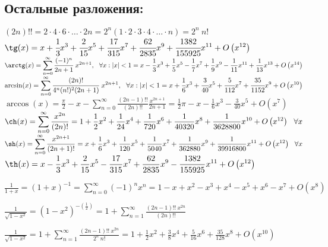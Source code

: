 \documentclass[12pt, a6paper]{extarticle}
\begin{document}
\subsection{Остальные разложения:}
$ (2n)!! = 2 \cdot 4 \cdot 6 \cdot \ldots \cdot 2n = 2^n (1 \cdot 2 \cdot 3 \cdot 4 \cdot \ldots \cdot n)=2^n\ n! $
\newline \newline \newline
$\displaystyle \tg(x) = x+\cfrac{1}{3}x^{3}+\cfrac{2}{15} {x}^{5}+{\cfrac {17}{315}} {x}^{7}+{\cfrac {62}{2835}} {x}^{9}
\mbox{}+{\cfrac {1382}{155925}} {x}^{11}+O \left( {x}^{12} \right) $
\newline \newline
$\displaystyle  \arctg(x) = \sum\limits_{n=0}^\infty{\cfrac{(-1)^n}{2n+1}\ x^{2n+1}}, \ \ \forall x: |x|<1 = x-\frac{1}{3} {x}^{3}+\frac{1}{5} {x}^{5}-\frac{1}{7} {x}^{7}+\frac{1}{9} {x}^{9}-\frac{1}{11} {x}^{11}+\frac{1}{13} {x}^{13}+O \left( {x}^{14} \right)$
\newline \newline
$\displaystyle \arcsin(x) = \sum\limits_{n=0}^\infty{\cfrac{(2n)!}{4^n(n!)^2(2n+1)}\ x^{2n+1}}, \ \ \forall x: |x|<1 = x+\cfrac{1}{6} {x}^{3}+{\cfrac {3}{40}} {x}^{5}+{\cfrac {5}{112}} {x}^{7} + {\cfrac {35}{1152}} {x}^{9}+O \left( {x}^{10} \right)$
\newline \newline
$\displaystyle \arccos(x) = \frac{\pi}{2} - x - \sum\limits_{n=0}^\infty{\frac{(2n-1)!!}{(2n)!!}\frac{x^{2n+1}}{2n+1}} = \frac{1}{2} \pi -x-\frac{1}{6} {x}^{3}-{\frac {3}{40}} {x}^{5} + O \left( {x}^{7} \right)$
\newline \newline
$\displaystyle \ch(x) = \sum\limits_{n=0}^\infty{\frac{x^{2n}}{(2n)!}} = 1+\frac{1}{2}x^2+\frac{1}{24}x^4+\frac{1}{720}x^6+\frac{1}{40320}x^8+\frac{1}{3628800}x^{10} + O\left( {x}^{12} \right)\ \ \forall x$
\newline \newline
$\displaystyle \sh(x) = \sum\limits_{n=0}^\infty{\frac{x^{2n+1}}{(2n+1)!}} =  x+\frac{1}{6}x^3+\frac{1}{120}x^5+\frac{1}{5040}x^7+\frac{1}{362880}x^9+\frac{1}{39916800}x^{11} + O\left( {x}^{12} \right)\ \ \forall x$
\newline \newline
$\displaystyle \th(x) = x-\frac{1}{3}x^3+\frac{2}{15}x^5-\frac{17}{315}x^7+\frac{62}{2835}x^9-\frac{1382}{155925}x^{11} + O\left( {x}^{12} \right)$
\par \- \newline
$\displaystyle \frac{1}{1+x} = (1+x)^{-1} = \sum\limits_{n=0}^\infty{(-1)^n x^n} = 1-x+x^2-x^3+x^4-x^5+x^6-x^7+ O\left( {x}^{8} \right)$
\par \- \newline
$\displaystyle \frac{1}{\sqrt{1-x^2}} = (1-x^2)^{-\left(\frac{1}{2}\right)} = 1 + \sum\limits_{n=1}^\infty{\frac{(2n-1)!!\ x^{2n}}{(2n)!!}} $
\par \- \newline
$\displaystyle \frac{1}{\sqrt{1-x^2}} = 1 + \sum\limits_{n=1}^\infty{\frac{(2n-1)!!\ x^{2n}}{2^n\ n!}} = 1+\frac{1}{2}x^2+\frac{3}{8}x^4+\frac{5}{16}x^6+\frac{35}{128}x^8+ O\left({x}^{10} \right)$
\par \- \newline
\end{document}
